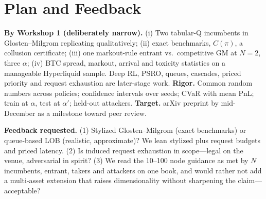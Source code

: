 \documentclass[11pt]{article}
\begin{document}
\section{Plan and Feedback}
\textbf{By Workshop 1 (deliberately narrow).} (i) Two tabular-Q incumbents in Glosten--Milgrom replicating \cite{cfl} qualitatively; (ii) exact benchmarks, $C(\pi)$, a collusion certificate; (iii) one markout-rule entrant vs.\ competitive GM at $N=2$, three $\alpha$; (iv) BTC spread, markout, arrival and toxicity statistics on a manageable Hyperliquid sample. Deep RL, PSRO, queues, cascades, priced priority and request exhaustion are later-stage work. \textbf{Rigor.} Common random numbers across policies; confidence intervals over seeds; CVaR with mean PnL; train at $\alpha$, test at $\alpha'$; held-out attackers. \textbf{Target.} arXiv preprint by mid-December as a milestone toward peer review.

\textbf{Feedback requested.} (1) Stylized Glosten--Milgrom (exact benchmarks) or queue-based LOB (realistic, approximate)? We lean stylized plus request budgets and priced latency. (2) Is induced request exhaustion in scope---legal on the venue, adversarial in spirit? (3) We read the 10--100 node guidance as met by $N$ incumbents, entrant, takers and attackers on one book, and would rather not add a multi-asset extension that raises dimensionality without sharpening the claim---acceptable?
\end{document}
